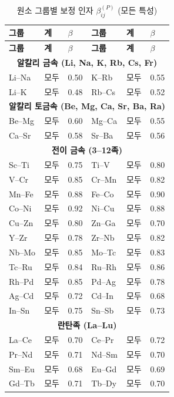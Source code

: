 \documentclass[12pt,a4paper]{article}
\begin{document}
	\begin{longtable}{p{2.5cm} p{2.5cm} p{1.2cm} p{2.5cm} p{2.5cm} p{1.2cm}}
		\caption{원소 그룹별 보정 인자 $\beta_{ij}^{(P)}$ (모든 특성)}\label{tab:beta_group}\\
		\toprule
		\textbf{그룹} & \textbf{계} & $\beta$ & \textbf{그룹} & \textbf{계} & $\beta$ \\
		\midrule
		\endfirsthead
		\toprule
		\textbf{그룹} & \textbf{계} & $\beta$ & \textbf{그룹} & \textbf{계} & $\beta$ \\
		\midrule
		\endhead
		\multicolumn{6}{c}{\textbf{알칼리 금속 (Li, Na, K, Rb, Cs, Fr)}} \\
		Li–Na & 모두 & 0.50 & K–Rb & 모두 & 0.55 \\
		Li–K  & 모두 & 0.48 & Rb–Cs & 모두 & 0.52 \\
		\multicolumn{6}{c}{\textbf{알칼리 토금속 (Be, Mg, Ca, Sr, Ba, Ra)}} \\
		Be–Mg & 모두 & 0.60 & Mg–Ca & 모두 & 0.55 \\
		Ca–Sr & 모두 & 0.58 & Sr–Ba & 모두 & 0.56 \\
		\multicolumn{6}{c}{\textbf{전이 금속 (3–12족)}} \\
		Sc–Ti & 모두 & 0.75 & Ti–V & 모두 & 0.80 \\
		V–Cr  & 모두 & 0.85 & Cr–Mn & 모두 & 0.82 \\
		Mn–Fe & 모두 & 0.88 & Fe–Co & 모두 & 0.90 \\
		Co–Ni & 모두 & 0.92 & Ni–Cu & 모두 & 0.88 \\
		Cu–Zn & 모두 & 0.80 & Zn–Ga & 모두 & 0.70 \\
		Y–Zr  & 모두 & 0.78 & Zr–Nb & 모두 & 0.82 \\
		Nb–Mo & 모두 & 0.85 & Mo–Tc & 모두 & 0.83 \\
		Tc–Ru & 모두 & 0.84 & Ru–Rh & 모두 & 0.86 \\
		Rh–Pd & 모두 & 0.85 & Pd–Ag & 모두 & 0.78 \\
		Ag–Cd & 모두 & 0.72 & Cd–In & 모두 & 0.68 \\
		In–Sn & 모두 & 0.75 & Sn–Sb & 모두 & 0.73 \\
		\multicolumn{6}{c}{\textbf{란탄족 (La–Lu)}} \\
		La–Ce & 모두 & 0.70 & Ce–Pr & 모두 & 0.72 \\
		Pr–Nd & 모두 & 0.71 & Nd–Sm & 모두 & 0.70 \\
		Sm–Eu & 모두 & 0.68 & Eu–Gd & 모두 & 0.69 \\
		Gd–Tb & 모두 & 0.71 & Tb–Dy & 모두 & 0.70 \\

\end{longtable}
\end{document}
